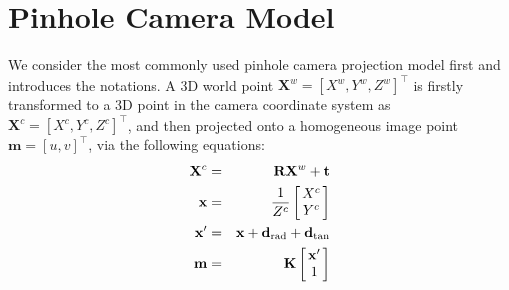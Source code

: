 \documentclass{report}
\begin{document}
\section{Pinhole Camera Model}
\label{pinholeSec}
We consider the most commonly used pinhole camera projection model first and introduces the notations. A 3D world point $\mathbf{X}^w = [X^w, Y^w, Z^w]^\top$ is firstly transformed to a 3D point in the camera coordinate system as $\mathbf{X}^c = [X^c, Y^c, Z^c]^\top$, and then projected onto a homogeneous image point $\mathbf{m} = [u, v]^\top$, via the following equations: 
\begin{eqnarray}
\label{cmEqn1}
\mathbf{X}^c &=&
\mathbf{R} \mathbf{X}^w + \mathbf{t} \\
\mathbf{x} &=& \frac{1}{Z^c} 
\arraycolsep=1.5pt%
\begin{bmatrix}
\begin{array}{c}
X^c \\ Y^c
\end{array}
\label{rayEqn}
\end{bmatrix} \\
\mathbf{x}' &=& \mathbf{x} + \mathbf{d}_\text{rad} + \mathbf{d}_\text{tan} \label{distEqn0}\\
\mathbf{m} &=&
\mathbf{K}
\arraycolsep=1.5pt%
\begin{bmatrix}
	\begin{array}{c}
	\mathbf{x}'\\ 1
	\end{array}
\end{bmatrix}
\label{cmEqn4} 
\end{eqnarray}
\end{document}
